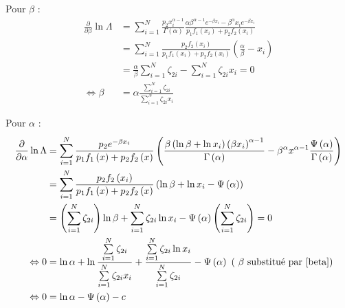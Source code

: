 \documentclass[10pt,a4paper]{article}
\begin{document}
Pour $\beta$ :
\begin{align}
    \frac{\partial }{{\partial \beta }}\ln \Lambda  & = \sum\limits_{i = 1}^N {\frac{{{p_2}x_i^{\alpha  - 1}}}{{\Gamma \left( \alpha  \right)}}\frac{{\alpha {\beta ^{\alpha  - 1}}{e^{ - \beta {x_i}}} - {\beta ^\alpha }{x_i}{e^{ - \beta {x_i}}}}}{{{p_1}{f_1}\left( {{x_i}} \right) + {p_2}{f_2}\left( {{x_i}} \right)}}} \nonumber \\
    & = \sum\limits_{i = 1}^N {\frac{{{p_2}{f_2}\left( {{x_i}} \right)}}{{{p_1}{f_1}\left( {{x_i}} \right) + {p_2}{f_2}\left( {{x_i}} \right)}}\left( {\frac{\alpha }{\beta } - {x_i}} \right)} \nonumber \nonumber \\
    & = \frac{\alpha }{\beta }\sum\limits_{i = 1}^N {{\zeta _{2i}}}  - \sum\limits_{i = 1}^N {{\zeta _{2i}}{x_i}}  = 0 \nonumber \\
    \label{beta}
    \Leftrightarrow \beta & = \alpha \frac{{\sum\limits_{i = 1}^N {{\zeta _{2i}}} }}{{\sum\limits_{i = 1}^N {{\zeta _{2i}}{x_i}} }}
\end{align}

Pour $\alpha$ : 
\begin{align*}
    \frac{\partial }{{\partial \alpha }}\ln \Lambda  & = \sum\limits_{i = 1}^N {\frac{{{p_2}{e^{ - \beta {x_i}}}}}{{{p_1}{f_1}\left( x \right) + {p_2}{f_2}\left( x \right)}}\left( {\frac{{\beta \left( {\ln \beta  + \ln {x_i}} \right){{\left( {\beta {x_i}} \right)}^{\alpha  - 1}}}}{{\Gamma \left( \alpha  \right)}} - {\beta ^\alpha }{x^{\alpha  - 1}}\frac{{\Psi \left( \alpha  \right)}}{{\Gamma \left( \alpha  \right)}}} \right)} \\
    & = \sum\limits_{i = 1}^N {\frac{{{p_2}{f_2}\left( {{x_i}} \right)}}{{{p_1}{f_1}\left( x \right) + {p_2}{f_2}\left( x \right)}}\left( {\ln \beta  + \ln {x_i} - \Psi \left( \alpha  \right)} \right)} \\
    & = \left( {\sum\limits_{i = 1}^N {{\zeta _{2i}}} } \right)\ln \beta  + \sum\limits_{i = 1}^N {{\zeta _{2i}}\ln {x_i}}  - \Psi \left( \alpha  \right)\left( {\sum\limits_{i = 1}^N {{\zeta _{2i}}} } \right) = 0 \\
    \Leftrightarrow 0 & = \ln \alpha  + \ln \frac{{\sum\limits_{i = 1}^N {{\zeta _{2i}}} }}{{\sum\limits_{i = 1}^N {{\zeta _{2i}}{x_i}} }} + \frac{{\sum\limits_{i = 1}^N {{\zeta _{2i}}\ln {x_i}} }}{{\sum\limits_{i = 1}^N {{\zeta _{2i}}} }} - \Psi \left( \alpha  \right) \text{ ( }\beta \text{ substitué par \eqref{beta})} \\
    \Leftrightarrow 0 & = \ln \alpha  - \Psi \left( \alpha  \right) - c
\end{align*}
\end{document}
